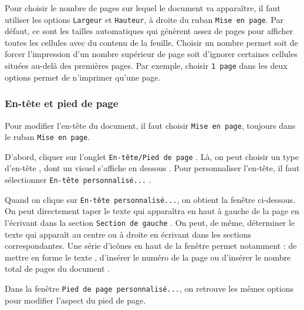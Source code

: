 Pour choisir le nombre de pages sur lequel le document va apparaître, il faut utiliser les options \texttt{Largeur} et \texttt{Hauteur}, à droite du ruban \texttt{Mise en page}. Par défaut, ce sont les tailles automatiques qui génèrent assez de pages pour afficher toutes les cellules avec du contenu de la feuille. Choisir un nombre permet soit de forcer l'impression d'un nombre supérieur de page soit d'ignorer certaines cellules situées au-delà des premières pages. Par exemple, choisir \texttt{1 page} dans les deux options permet de n'imprimer qu'une page.




\subsubsection{En-tête et pied de page}

Pour modifier l'en-tête du document, il faut choisir \texttt{Mise en page}, toujours dans le ruban \texttt{Mise en page}.

D'abord, cliquer sur l'onglet \texttt{En-tête/Pied de page} . Là, on peut choisir un type d'en-tête , dont un visuel s'affiche en dessous . Pour personnaliser l'en-tête, il faut sélectionner \texttt{En-tête personnalisé...} .


Quand on clique sur \texttt{En-tête personnalisé...}, on obtient la fenêtre ci-dessous. On peut directement taper le texte qui apparaîtra en haut à gauche de la page en l'écrivant dans la section \texttt{Section de gauche} . On peut, de même, déterminer le texte qui apparaît au centre ou à droite en écrivant dans les sections correspondantes. Une série d'icônes en haut de la fenêtre permet notamment : de mettre en forme le texte , d'insérer le numéro de la page  ou d'insérer le nombre total de pages du document .



Dans la fenêtre \texttt{Pied de page personnalisé...}, on retrouve les mêmes options pour modifier l'aspect du pied de page.





